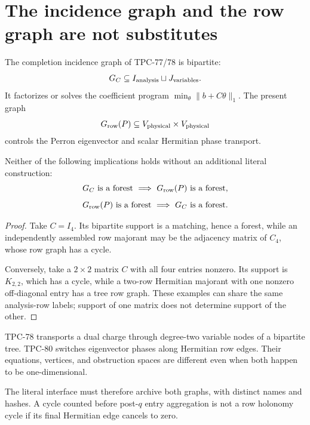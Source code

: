 \section{The incidence graph and the row graph are not substitutes}
\label{sec:two-graphs}

The completion incidence graph of TPC-77/78 is bipartite:
\[
 G_C\subseteq I_{\rm analysis}\sqcup J_{\rm variables}.
\]
It factorizes or solves the coefficient program
\(\min_\theta\|b+C\theta\|_1\).  The present graph
\[
 G_{\rm row}(P)\subseteq V_{\rm physical}\times V_{\rm physical}
\]
controls the Perron eigenvector and scalar Hermitian phase transport.

\begin{proposition}\label{prop:non-substitution}
Neither of the following implications holds without an additional
literal construction:
\[
 G_C\text{ is a forest}
 \ \Longrightarrow\
 G_{\rm row}(P)\text{ is a forest},
\]
\[
 G_{\rm row}(P)\text{ is a forest}
 \ \Longrightarrow\
 G_C\text{ is a forest}.
\]
\end{proposition}

\begin{proof}
Take \(C=I_4\).  Its bipartite support is a matching, hence a forest,
while an independently assembled row majorant may be the adjacency
matrix of \(C_4\), whose row graph has a cycle.

Conversely, take a \(2\times2\) matrix \(C\) with all four entries
nonzero.  Its support is \(K_{2,2}\), which has a cycle, while a
two-row Hermitian majorant with one nonzero off-diagonal entry has a
tree row graph.  These examples can share the same analysis-row labels;
support of one matrix does not determine support of the other.
\end{proof}

\begin{remark}
TPC-78 transports a dual charge through degree-two variable nodes of a
bipartite tree.  TPC-80 switches eigenvector phases along Hermitian row
edges.  Their equations, vertices, and obstruction spaces are
different even when both happen to be one-dimensional.
\end{remark}

The literal interface must therefore archive both graphs, with distinct
names and hashes.  A cycle counted before post-\(q\) entry aggregation
is not a row holonomy cycle if its final Hermitian edge cancels to zero.
